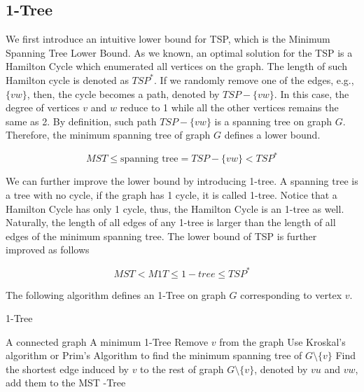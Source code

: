             \subsection{1-Tree}
                We first introduce an intuitive lower bound for TSP, which is the Minimum Spanning Tree Lower Bound. As we known, an optimal solution for the TSP is a Hamilton Cycle which enumerated all vertices on the graph. The length of such Hamilton cycle is denoted as $TSP^*$. If we randomly remove one of the edges, e.g., $\{vw\}$, then, the cycle becomes a path, denoted by $TSP - \{vw\}$. In this case, the degree of vertices $v$ and $w$ reduce to 1 while all the other vertices remains the same as 2. By definition, such path $TSP - \{vw\}$ is a spanning tree on graph $G$. Therefore, the minimum spanning tree of graph $G$ defines a lower bound.

                \begin{equation*}
                    MST \le \text{spanning tree} = TSP - \{vw\} < TSP^*
                \end{equation*}

                We can further improve the lower bound by introducing 1-tree. A spanning tree is a tree with no cycle, if the graph has 1 cycle, it is called 1-tree. Notice that a Hamilton Cycle has only 1 cycle, thus, the Hamilton Cycle is an 1-tree as well. Naturally, the length of all edges of any 1-tree is larger than the length of all edges of the minimum spanning tree. The lower bound of TSP is further improved as follows

                \begin{equation*}
                    MST < M1T \le 1-tree \le TSP^*
                \end{equation*}

                The following algorithm defines an 1-Tree on graph $G$ corresponding to vertex $v$.

                \begin{algorithm}
                    \caption{1-Tree}
                    \begin{algorithmic}
                        \Require A connected graph
                        \Ensure A minimum 1-Tree
                        \State Remove $v$ from the graph
                        \State Use Kroskal's algorithm or Prim's Algorithm to find the minimum spanning tree of $G \setminus \{v\}$
                        \State Find the shortest edge induced by $v$ to the rest of graph $G \setminus \{v\}$, denoted by $vu$ and $vw$, add them to the MST
                        \State {}-Tree
                    \end{algorithmic}
                \end{algorithm}

